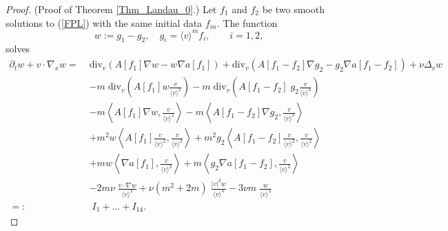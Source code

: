 \documentclass[11pt,american, reqno]{amsart}
\numberwithin{equation}{section}
\newcommand{\1}{\mathds{1}}
\numberwithin{equation}{section}
\begin{document}
\begin{proof} (Proof of Theorem \ref{Thm_Landau_0}.)
Let $f_1$ and $f_2$ be two smooth solutions to (\ref{FPL}) with the same initial data $f_{in}$.  The function 
$$
w := g_1-g_2, \quad g_i = \langle v \rangle ^m f_i,
\qquad i = 1, 2,
$$ 
solves
\begin{align*}%
\partial_t w + v \cdot \nabla_x w = \;&\textrm{div}_v \left( A[f_1] \nabla w - w \nabla a[f_1]\right)+\textrm{div}_v \left( A[f_1-f_2] \nabla g_2 - g_2 \nabla a[f_1-f_2]\right)  +\nu \Delta_v w  \nonumber \\
&-m\; \textrm{div}_v \left( A[f_1]w \frac{v}{ \langle v \rangle ^2}\right)-m\; \textrm{div}_v \left( A[f_1-f_2]\; g_2 \frac{v}{ \langle v \rangle ^2}\right) \nonumber \\
&- m \left  \langle A[f_1]   \nabla w ,  \frac{v}{ \langle v \rangle ^2}\right  \rangle - m \left  \langle A[f_1-f_2]   \nabla g_2 ,  \frac{v}{ \langle v \rangle ^2}\right  \rangle \nonumber \\
& +m^2 w \left \langle A[f_1]  \frac{v}{ \langle v \rangle ^2}  ,  \frac{v}{ \langle v \rangle ^2}\right  \rangle +m^2 g_2 \left \langle A[f_1-f_2]  \frac{v}{ \langle v \rangle ^2}  ,  \frac{v}{ \langle v \rangle ^2}\right  \rangle  \nonumber \\
& + m w \left \langle  \nabla a[f_1],  \frac{v}{ \langle v \rangle ^2}\right  \rangle  + m \left \langle g_2 \nabla a[f_1-f_2],  \frac{v}{ \langle v \rangle ^2}\right  \rangle \nonumber  \\
&- 2m \nu  \;\frac{v \cdot \nabla w }{\langle v \rangle ^2} +\nu  (m^2+2m)\; \frac{|v|^2w }{\langle v \rangle ^4} -3\nu m \; \frac{ w }{\langle v \rangle ^2} \nonumber\\
=:&\; I_1 + ...+ I_{14}.
\end{align*}


\end{proof}
\end{document}
